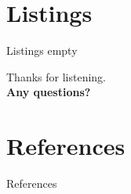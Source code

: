\documentclass[aspectratio=43,t]{beamer}
\begin{document}
\section{Listings}
\begin{frame}[fragile]{Listings}
  empty
\end{frame}

  { %
    \begin{frame}[c,noframenumbering]
      \begin{center}
        Thanks for listening.\\
        {\bf Any questions?}
      \end{center}
    \end{frame}

    \section*{References}
    \begin{frame}{References}
      \printbibliography
    \end{frame}
  }
\end{document}

